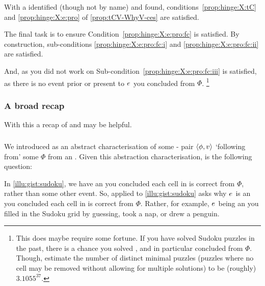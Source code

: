 \begin{note}
  With a \torNa{} identified (though not by name) and \tpro{} found, conditions~\ref{prop:hinge:X:tC} and \ref{prop:hinge:X:e:pro} of \autoref{prop:tCV-WhyV-ces} are satisfied.

  The final task is to ensure Condition~\ref{prop:hinge:X:e:pro:fc} is satisfied.
  By construction, sub-conditions \ref{prop:hinge:X:e:pro:fc:i} and \ref{prop:hinge:X:e:pro:fc:ii} are satisfied.

  And, as you did not work on \sudokuPuzR{} Sub-condition~\ref{prop:hinge:X:e:pro:fc:iii} is satisfied, as there is no event prior or present to \(e\sb{}\) \inwhich{} you concluded \sudokuRPV{} from \(\Phi\).%
  \footnote{
    This does maybe require some fortune.
    If you have solved Sudoku puzzles in the past, there is a chance you solved \sudokuPuzR{}, and in particular concluded \sudokuRPV{} from \(\Phi\).
    Though, \citeauthor{Berthier:2010aa} estimate the number of distinct minimal puzzles (puzzles where no cell may be removed without allowing for multiple solutions) to be (roughly) \(3.1055^{37}\).
  }
\end{note}



\subsubsection{A broad recap}


\begin{note}
  With this a recap of \qWhy{} and \qHow{} may be helpful.
\end{note}


\subparagraph*{\qWhy{}}


\begin{note}
  We introduced \ros{} as an abstract characterisation of some - pair \(\langle\phi, v\rangle\) `following from' some \pool{} \(\Phi\) from an \agpe{}.
  Given this abstraction characterisation, \qWhy{} is the following question:

\end{note}


\begin{note}
  In \autoref{illu:gist:sudoku}, we have an  you concluded each cell in \sudokuPuzL{} is correct from \(\Phi\), rather than some other event.
  So, \qWhy{} applied to \autoref{illu:gist:sudoku} asks why \(e\sb{}\) is an  you concluded each cell in \sudokuPuzL{} is correct from \(\Phi\).
  Rather, for example, \(e\sb{}\) being an  you filled in the Sudoku grid by guessing, took a nap, or drew a penguin.
\end{note}


